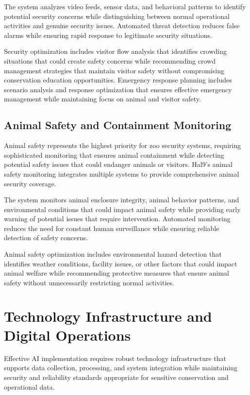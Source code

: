 \documentclass[
  Letterpaper,
]{scrbook}
\begin{document}
The system analyzes video feeds, sensor data, and behavioral patterns to
identify potential security concerns while distinguishing between normal
operational activities and genuine security issues. Automated threat
detection reduces false alarms while ensuring rapid response to
legitimate security situations.

Security optimization includes visitor flow analysis that identifies
crowding situations that could create safety concerns while recommending
crowd management strategies that maintain visitor safety without
compromising conservation education opportunities. Emergency response
planning includes scenario analysis and response optimization that
ensures effective emergency management while maintaining focus on animal
and visitor safety.

\subsection{Animal Safety and Containment
Monitoring}\label{animal-safety-and-containment-monitoring}

Animal safety represents the highest priority for zoo security systems,
requiring sophisticated monitoring that ensures animal containment while
detecting potential safety issues that could endanger animals or
visitors. Hal9's animal safety monitoring integrates multiple systems to
provide comprehensive animal security coverage.

The system monitors animal enclosure integrity, animal behavior
patterns, and environmental conditions that could impact animal safety
while providing early warning of potential issues that require
intervention. Automated monitoring reduces the need for constant human
surveillance while ensuring reliable detection of safety concerns.

Animal safety optimization includes environmental hazard detection that
identifies weather conditions, facility issues, or other factors that
could impact animal welfare while recommending protective measures that
ensure animal safety without unnecessarily restricting normal
activities.

\section{Technology Infrastructure and Digital
Operations}\label{technology-infrastructure-and-digital-operations}

Effective AI implementation requires robust technology infrastructure
that supports data collection, processing, and system integration while
maintaining security and reliability standards appropriate for sensitive
conservation and operational data.
\end{document}
